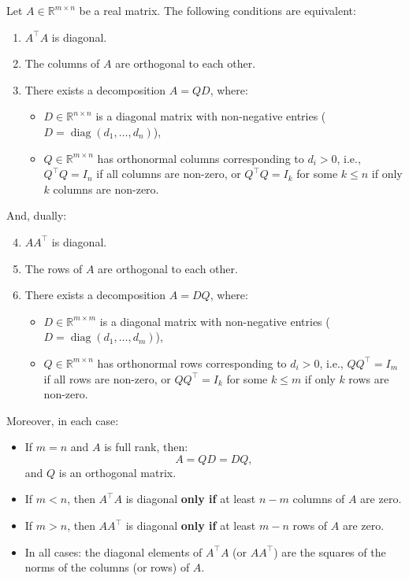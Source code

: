 \begin{theorem}
Let \( A \in \mathbb{R}^{m \times n} \) be a real matrix. The following conditions are equivalent:

\begin{enumerate}
    \item \( A^\top A \) is diagonal.
    \item The columns of \( A \) are orthogonal to each other.
    \item There exists a decomposition \( A = Q D \), where:
    \begin{itemize}
        \item \( D \in \mathbb{R}^{n \times n} \) is a diagonal matrix with non-negative entries (\( D = \operatorname{diag}(d_1, \dots, d_n) \)),
        \item \( Q \in \mathbb{R}^{m \times n} \) has orthonormal columns corresponding to \( d_i > 0 \), i.e., \( Q^\top Q = I_n \) if all columns are non-zero, or \( Q^\top Q = I_k \) for some \( k \leq n \) if only \( k \) columns are non-zero.
    \end{itemize}
\end{enumerate}

And, dually:

\begin{enumerate}
    \setcounter{enumi}{3}
    \item \( A A^\top \) is diagonal.
    \item The rows of \( A \) are orthogonal to each other.
    \item There exists a decomposition \( A = D Q \), where:
    \begin{itemize}
        \item \( D \in \mathbb{R}^{m \times m} \) is a diagonal matrix with non-negative entries (\( D = \operatorname{diag}(d_1, \dots, d_m) \)),
        \item \( Q \in \mathbb{R}^{m \times n} \) has orthonormal rows corresponding to \( d_i > 0 \), i.e., \( Q Q^\top = I_m \) if all rows are non-zero, or \( Q Q^\top = I_k \) for some \( k \leq m \) if only \( k \) rows are non-zero.
    \end{itemize}
\end{enumerate}

Moreover, in each case:

\begin{itemize}
    \item If \( m = n \) and \( A \) is full rank, then:
    \[
    A = Q D = D Q,
    \]
    and \( Q \) is an orthogonal matrix.
    \item If \( m < n \), then \( A^\top A \) is diagonal \textbf{only if} at least \( n - m \) columns of \( A \) are zero.
    \item If \( m > n \), then \( A A^\top \) is diagonal \textbf{only if} at least \( m - n \) rows of \( A \) are zero.
    \item In all cases: the diagonal elements of \( A^\top A \) (or \( A A^\top \)) are the squares of the norms of the columns (or rows) of \( A \).
\end{itemize}
\end{theorem}

